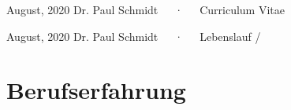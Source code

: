 \documentclass[11pt, a4paper]{awesome-cv}
\begin{document}
\makecvheader

\makecvfooter
  {August, 2020}
    {Dr. Paul Schmidt~~~·~~~Curriculum Vitae}
  {\thepage}





\makecvfooter
  {August, 2020}
    {Dr. Paul Schmidt~~~·~~~Lebenslauf}
  {\thepage/\pageref{LastPage}}

\hypertarget{berufserfahrung}{%
\section{Berufserfahrung}\label{berufserfahrung}}
\end{document}
